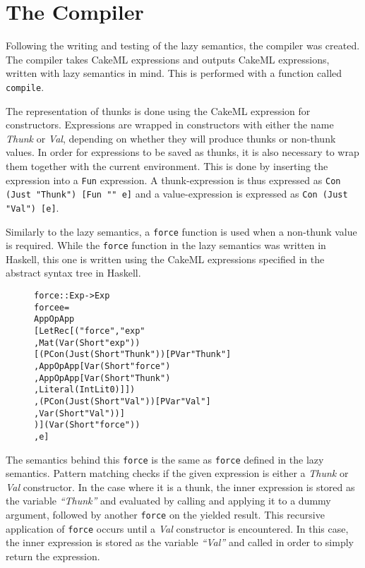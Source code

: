 \section{The Compiler}

Following the writing and testing of the lazy semantics, the compiler was
created. The compiler takes CakeML expressions and outputs CakeML expressions,
written with lazy semantics in mind. This is performed with a function called
\texttt{compile}.

The representation of thunks is done using the CakeML expression for
constructors. Expressions are wrapped in constructors with either the name
\textit{Thunk} or \textit{Val}, depending on whether they will produce thunks or
non-thunk values. In order for expressions to be saved as thunks, it is also
necessary to wrap them together with the current environment. This is done by
inserting the expression into a \texttt{Fun} expression. A thunk-expression is
thus expressed as \texttt{Con (Just "Thunk") [Fun "" e]} and a value-expression
is expressed as \texttt{Con (Just "Val") [e]}.

Similarly to the lazy semantics, a \texttt{force} function is used when a
non-thunk value is required. While the \texttt{force} function in the lazy
semantics was written in Haskell, this one is written using the CakeML
expressions specified in the abstract syntax tree in Haskell.

\begin{figure}[!ht]
\begin{alltt}
force :: Exp -> Exp
force e =
App OpApp
  [LetRec [("force", "exp"
          , Mat (Var (Short "exp"))
            [(PCon (Just (Short "Thunk")) [PVar "Thunk"]
             , App OpApp [Var (Short "force")
                         , App OpApp [Var (Short "Thunk")
                                     , Literal (IntLit 0)]])
            ,(PCon (Just (Short "Val")) [PVar "Val"]
             , Var (Short "Val"))]
          )] (Var (Short "force"))
  , e]
\end{alltt}
\end{figure}

\noindent The semantics behind this \texttt{force} is the same as \texttt{force} defined
in the lazy semantics. Pattern matching checks if the given expression is either
a \textit{Thunk} or \textit{Val} constructor. In the case where it is a thunk,
the inner expression is stored as the variable \textit{``Thunk''} and evaluated
by calling and applying it to a dummy argument, followed by another
\texttt{force} on the yielded result. This recursive application of
\texttt{force} occurs until a \textit{Val} constructor is encountered. In this
case, the inner expression is stored as the variable \textit{``Val''} and called
in order to simply return the expression.

